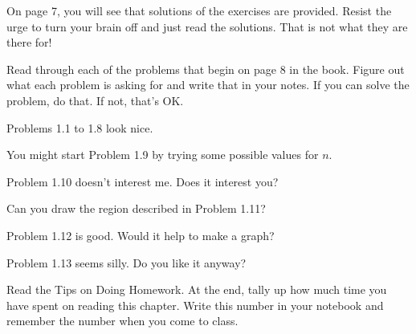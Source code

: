 On page 7, you will see that solutions of the exercises are provided.
Resist the urge to turn your brain off and just read the solutions.  That is not what they are there for!

Read through each of the problems that begin on page 8 in the book.
Figure out what each problem is asking for and write that in your notes.
If you can solve the problem, do that.
If not, that's OK.

Problems 1.1 to 1.8 look nice.

You might start Problem 1.9 by trying some possible values for $n$.

Problem 1.10 doesn't interest me.  Does it interest you?

Can you draw the region described in Problem 1.11?

Problem 1.12 is good.  Would it help to make a graph?

Problem 1.13 seems silly.  Do you like it anyway?

Read the Tips on Doing Homework.
At the end, tally up how much time you have spent on reading this chapter.
Write this number in your notebook and remember the number when you come to class.
